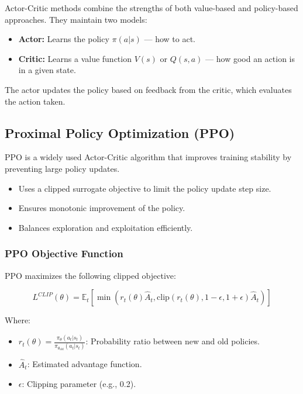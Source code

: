 \documentclass[12pt]{article}
\begin{document}
Actor-Critic methods combine the strengths of both value-based and policy-based approaches. They maintain two models:

\begin{itemize}
    \item \textbf{Actor:} Learns the policy $\pi(a|s)$ — how to act.
    \item \textbf{Critic:} Learns a value function $V(s)$ or $Q(s,a)$ — how good an action is in a given state.
\end{itemize}

The actor updates the policy based on feedback from the critic, which evaluates the action taken.

\subsection{Proximal Policy Optimization (PPO)}

PPO is a widely used Actor-Critic algorithm that improves training stability by preventing large policy updates.

\begin{itemize}
    \item Uses a clipped surrogate objective to limit the policy update step size.
    \item Ensures monotonic improvement of the policy.
    \item Balances exploration and exploitation efficiently.
\end{itemize}

\subsubsection*{PPO Objective Function}

PPO maximizes the following clipped objective:

\[
L^{CLIP}(\theta) = \mathbb{E}_t \left[ \min \left( r_t(\theta) \hat{A}_t, \text{clip}(r_t(\theta), 1 - \epsilon, 1 + \epsilon) \hat{A}_t \right) \right]
\]

Where:
\begin{itemize}
    \item $r_t(\theta) = \frac{\pi_\theta(a_t|s_t)}{\pi_{\theta_{\text{old}}}(a_t|s_t)}$: Probability ratio between new and old policies.
    \item $\hat{A}_t$: Estimated advantage function.
    \item $\epsilon$: Clipping parameter (e.g., 0.2).
\end{itemize}
\end{document}
